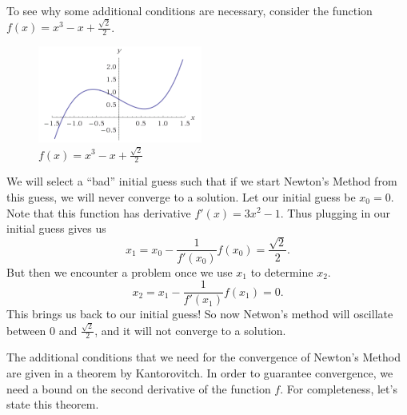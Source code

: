 \documentclass[twoside,letterpaper,11pt]{article}
\numberwithin{equation}{section}
\begin{document}
To see why some additional conditions are necessary, consider the function $f(x)
= x^3 - x + \frac{\sqrt{2}}{2}$.
\begin{figure}
  \begin{center}
    \includegraphics[width=0.48\textwidth]{newtonfail}
  \end{center}
  \caption{$f(x) = x^3 - x + \frac{\sqrt{2}}{2}$}
\end{figure}
We will select a ``bad'' initial guess such that if we start Newton's Method
from this guess, we will never converge to a solution.
Let our initial guess be $x_0 = 0$.
Note that this function has derivative $f'(x) = 3x^2 - 1$.
Thus plugging in our initial guess gives us
\begin{equation*}
  x_1 = x_0 - \frac{1}{f'(x_0)} f(x_0) = \frac{\sqrt{2}}{2}.
\end{equation*}
But then we encounter a problem once we use $x_1$ to determine $x_2$.
\begin{equation*}
  x_2 = x_1 - \frac{1}{f'(x_1)} f(x_1) = 0.
\end{equation*}
This brings us back to our initial guess!
So now Netwon's method will oscillate between $0$ and $\frac{\sqrt{2}}{2}$, and
it will not converge to a solution.

The additional conditions that we need for the convergence of Newton's Method
are given in a theorem by Kantorovitch.
In order to guarantee convergence, we need a bound on the second derivative of
the function $f$.
For completeness, let's state this theorem.
\end{document}

